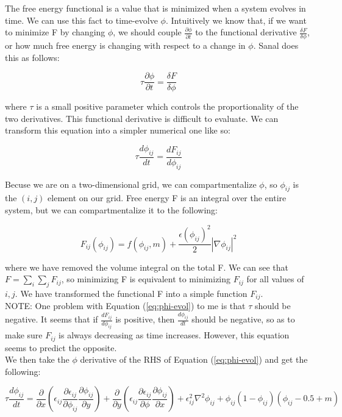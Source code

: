 \documentclass[10pt]{article} %
\begin{document}
The free energy functional is a value that is minimized when a system evolves in time. We can use this fact to time-evolve $\phi$. Intuitively we know that, if we want to minimize F by changing $\phi$, we should couple $\frac{\partial\phi}{\partial t}$ to the functional derivative $\frac{\delta F}{\delta \phi}$, or how much free energy is changing with respect to a change in $\phi$. Sanal does this as follows:

\begin{equation}
  \tau \frac{\partial \phi}{\partial t} = \frac{\delta F}{\delta \phi}
\end{equation}

where $\tau$ is a small positive parameter which controls the proportionality of the two derivatives. This functional derivative is difficult to evaluate. We can transform this equation into a simpler numerical one like so:

\begin{equation}
  \tau \frac{d\phi_{ij}}{dt} = \frac{dF_{ij}}{d\phi_{ij}}
  \label{eq:phi-evol}
\end{equation}

Becuse we are on a two-dimensional grid, we can compartmentalize $\phi$, so $\phi_{ij}$ is the $(i,j)$ element on our grid. Free energy F is an integral over the entire system, but we can compartmentalize it to the following:

\begin{equation}
  F_{ij}(\phi_{ij}) = f(\phi_{ij},m) + \frac{\epsilon(\phi_{ij})^2}{2}|\nabla\phi_{ij}|^2
\end{equation}

where we have removed the volume integral on the total F. We can see that $F = \sum_i \sum_j F_{ij}$, so minimizing F is equivalent to minimizing $F_{ij}$ for all values of $i,j$. We have transformed the functional F into a simple function $F_{ij}$.\\

NOTE: One problem with Equation (\ref{eq:phi-evol}) to me is that $\tau$ should be negative. It seems that if $\frac{dF_{ij}}{d\phi_{ij}}$ is positive, then $\frac{d\phi_{ij}}{dt}$ should be negative, so as to make sure $F_{ij}$ is always decreasing as time increases. However, this equation seems to predict the opposite.\\

We then take the $\phi$ derivative of the RHS of Equation (\ref{eq:phi-evol}) and get the following:

\begin{equation}
  \tau \frac{d\phi_{ij}}{dt} = \frac{\partial}{\partial x}\left(\epsilon_{ij}\frac{\partial \epsilon_{ij}}{\partial \phi_{ij}}\frac{\partial \phi_{ij}}{\partial y}\right) + \frac{\partial}{\partial y}\left(\epsilon_{ij}\frac{\partial \epsilon_{ij}}{\partial \phi}\frac{\partial \phi_{ij}}{\partial x}\right) + \epsilon_{ij}^2\nabla^2\phi_{ij} + \phi_{ij}\left(1-\phi_{ij}\right)\left(\phi_{ij}-0.5+m\right)
\end{equation}
\end{document}
